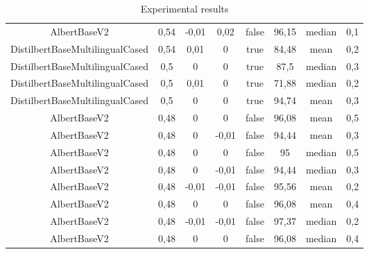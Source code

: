 \documentclass[\main/main.tex]{subfiles}
\begin{document}
\begin{table}
{\begin{tabular}{||c|c|c|c|c|c|c|c||}
AlbertBaseV2                    & 0,54 & -0,01 & 0,02  & false & 96,15 & median & 0,1 \\
DistilbertBaseMultilingualCased & 0,54 & 0,01  & 0     & true  & 84,48 & mean   & 0,2 \\
DistilbertBaseMultilingualCased & 0,5  & 0     & 0     & true  & 87,5  & median & 0,3 \\
DistilbertBaseMultilingualCased & 0,5  & 0,01  & 0     & true  & 71,88 & median & 0,2 \\
DistilbertBaseMultilingualCased & 0,5  & 0     & 0     & true  & 94,74 & mean   & 0,3 \\
AlbertBaseV2                    & 0,48 & 0     & 0     & false & 96,08 & mean   & 0,5 \\
AlbertBaseV2                    & 0,48 & 0     & -0,01 & false & 94,44 & mean   & 0,3 \\
AlbertBaseV2                    & 0,48 & 0     & 0     & false & 95    & median & 0,5 \\
AlbertBaseV2                    & 0,48 & 0     & -0,01 & false & 94,44 & median & 0,3 \\
AlbertBaseV2                    & 0,48 & -0,01 & -0,01 & false & 95,56 & mean   & 0,2 \\
AlbertBaseV2                    & 0,48 & 0     & 0     & false & 96,08 & mean   & 0,4 \\
AlbertBaseV2                    & 0,48 & -0,01 & -0,01 & false & 97,37 & median & 0,2 \\
AlbertBaseV2                    & 0,48 & 0     & 0     & false & 96,08 & median & 0,4 \\
\hline
\end{tabular}
}
\caption{Experimental results}
\label{tab:experimental_results_complete}
\end{table}
\end{document}
